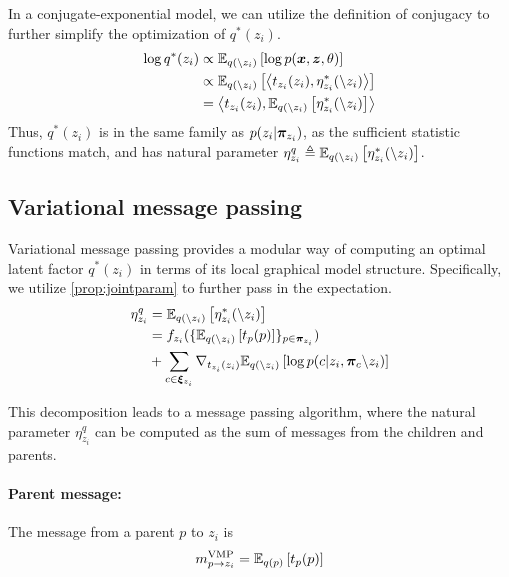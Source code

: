In a conjugate-exponential model, we can utilize the definition
of conjugacy to further simplify the optimization of $q^*(z_i)$.
\begin{equation}
\begin{split}
    \log q^*(z_i) &\propto \mathbb{E}_{q(\backslash z_i)} \left[
    \log p(\bm{x}, \bm{z}, \theta)\right]\\
    &\propto \mathbb{E}_{q(\backslash z_i)} \left[
    \left\langle t_{z_i}(z_i), \eta^*_{z_i}(\backslash z_i)\right\rangle\right]\\
    &= 
    \left\langle t_{z_i}(z_i), \mathbb{E}_{q(\backslash z_i)}\left[\eta^*_{z_i}(\backslash z_i)\right]\right\rangle
\end{split}
\end{equation}
Thus, $q^*(z_i)$ 
is in the same family as $p(z_i | \bm{\pi}_{z_i})$,
as the sufficient statistic functions match,
and has natural parameter $\eta^q_{z_i} \triangleq \mathbb{E}_{q(\backslash z_i)}\left[\eta^*_{z_i}(\backslash z_i)\right]$.

\subsection{Variational message passing}

Variational message passing provides a modular way of
computing
an optimal latent factor $q^*(z_i)$
in terms of its local graphical model structure.
Specifically, we utilize \autoref{prop:jointparam}
to further pass in the expectation.
\begin{equation}
\begin{split}
    \eta^q_{z_i} &= \mathbb{E}_{q(\backslash z_i)}\left[\eta^*_{z_i}(\backslash z_i)\right] \\
                 &= f_{z_i}(\{\mathbb{E}_{q(\backslash z_i)}\left[t_p(p)\right]\}_{p \in \bm{\pi}_{z_i}}) \\
                 &+ \sum_{c \in \bm{\xi}_{z_i}} 
         \nabla_{t_{z_i}(z_i)} \mathbb{E}_{q(\backslash z_i)}\left[\log p(c | z_i, \bm{\pi}_{c} \backslash z_i)\right]
\end{split}
\end{equation}

This decomposition leads to a message passing algorithm, where
the natural parameter $\eta^q_{z_i}$
can be computed as the sum of messages from the children and parents.
\paragraph{Parent message:}
The message from a parent $p$ to $z_i$ is
\begin{equation} \label{eq:parentmessage}
    m^{\text{VMP}}_{p \rightarrow z_i} = \mathbb{E}_{q(p)}\left[t_p(p)\right]
\end{equation}

